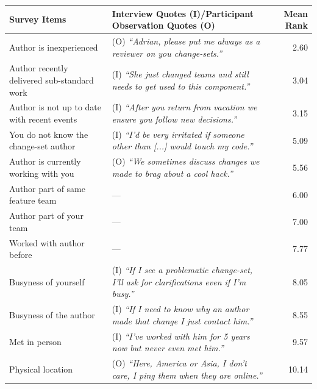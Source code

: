 \begin{table}
\small
\centering
\begin{tabular}{l@{\hspace{5pt}}l@{\hspace{-10pt}}r}
\toprule
Survey Items & Interview Quotes (I)/Participant Observation Quotes (O) & Mean Rank\\
\midrule
Author is inexperienced &(O) \emph{``Adrian, please put me always as a reviewer on you change-sets.''}& 2.60\\%
Author recently delivered sub-standard work&(I) \emph{``She just changed teams and still needs to get used to this component.''}& 3.04\\%
Author is not up to date with recent events &(I) \emph{``After you return from vacation we ensure you follow new decisions.''}& 3.15\\%
You do not know the change-set author &(I) \emph{``I'd be very irritated if someone other than [...] would touch my code.''}& 5.09\\%
Author is currently working with you &(O) \emph{``We sometimes discuss changes we made to brag about a cool hack.''}& 5.56\\%
Author part of same feature team &--- & 6.00\\%
Author part of your team &--- & 7.00\\%
Worked with author before &--- & 7.77\\%
Busyness of yourself &(I) \emph{``If I see a problematic change-set, I'll ask for clarifications even if I'm busy.''}& 8.05\\%
Busyness of the author &(I) {\small\emph{``If I need to know why an author made that change I just contact him.''}}& 8.55\\%
Met in person &(I) \emph{``I've worked with him for 5 years now but never even met him.''}& 9.57\\%
Physical location &(O) \emph{``Here, America or Asia, I don't care, I ping them when they are online.''}& 10.14\\%

\end{tabular}
\end{table}
